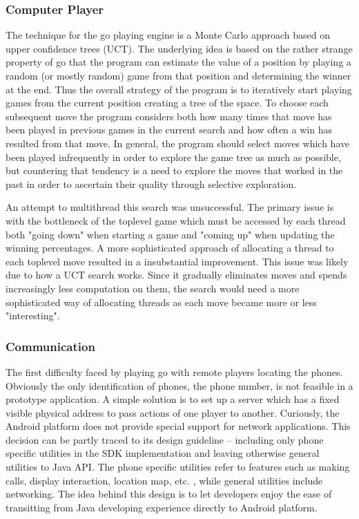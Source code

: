 \documentclass[acmtocl]{acmtrans2m}
\begin{document}
\subsubsection{Computer Player}

The technique for the go playing engine is a Monte Carlo approach based on upper confidence trees (UCT).  The underlying idea is based on the rather strange property of go that the program can estimate the value of a position by playing a random (or mostly random) game from that position and determining the winner at the end.  Thus the overall strategy of the program is to iteratively start playing games from the current position creating a tree of the space.  To choose each subsequent move the program considers both how many times that move has been played in previous games in the current search and how often a win has resulted from that move.  In general, the program should select moves which have been played infrequently in order to explore the game tree as much as possible, but countering that tendency is a need to explore the moves that worked in the past in order to ascertain their quality through selective exploration. 

An attempt to multithread this search was unsuccessful. The primary issue is with the bottleneck of the toplevel game which must be accessed by each thread both "going down" when starting a game and "coming up" when updating the winning percentages.  A more sophisticated approach of allocating a thread to each toplevel move resulted in a insubstantial improvement.  This issue was likely due to how a UCT search works.  Since it gradually eliminates moves and spends increasingly less computation on them, the search would need a more sophisticated way of allocating threads as each move became more or less "interesting".  

\subsubsection{Communication}
The first difficulty faced by playing go with remote players locating the phones. Obviously the only identification of phones, the phone number, is not feasible in a prototype application. A simple solution is to set up a server which has a fixed visible physical address to pass actions of one player to another.  Curiously, the Android platform does not provide special support for network applications. This decision can be partly traced to its design guideline – including only phone specific utilities in the SDK implementation and leaving otherwise general utilities to Java API. The phone specific utilities refer to features such as making calls, display interaction, location map, etc. , while general utilities include networking. The idea behind this design is to let developers enjoy the ease of transitting from Java developing experience directly to Android platform.
\end{document}

